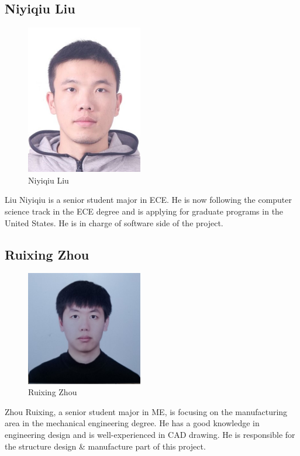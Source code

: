\documentclass[12pt]{article}
\begin{document}
\subsection*{Niyiqiu Liu}
\begin{figure}[H]
    \centering
    \includegraphics[width=2in]{l.jpg}
    \caption{Niyiqiu Liu}
    \label{fig::liu}
\end{figure}
Liu Niyiqiu is a senior student major in ECE. He is now following the computer science track in the ECE degree and is applying for graduate programs in the United States. He is in charge of software side of the project.
\subsection*{Ruixing Zhou}
\begin{figure}[H]
    \centering
    \includegraphics[width=2in]{z.jpg}
    \caption{Ruixing Zhou}
    \label{fig::qiu}
\end{figure}
Zhou Ruixing, a senior student major in ME, is focusing on the manufacturing area in the mechanical engineering degree. He has a good knowledge in engineering design and is well-experienced in CAD drawing. He is responsible for the structure design & manufacture part of this project.
\end{document}
